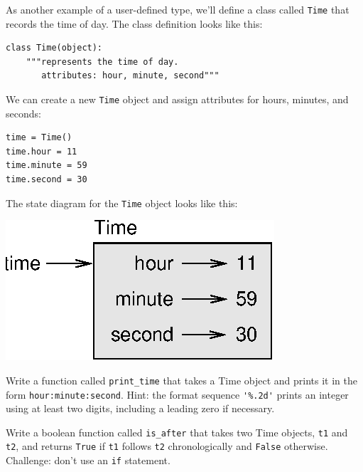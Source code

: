 \documentclass[10pt]{book}
\begin{document}
As another example of a user-defined type, we'll define a class called
{\tt Time} that records the time of day.  The class definition looks
like this:


\beforeverb
\begin{verbatim}
class Time(object):
    """represents the time of day.
       attributes: hour, minute, second"""
\end{verbatim}
\afterverb
%
We can create a new {\tt Time} object and assign
attributes for hours, minutes, and seconds:

\beforeverb
\begin{verbatim}
time = Time()
time.hour = 11
time.minute = 59
time.second = 30
\end{verbatim}
\afterverb
%
The state diagram for the {\tt Time} object looks like this:


\beforefig
\centerline{\includegraphics{figs/time.eps}}
\afterfig

\begin{ex}
\label{printtime}
Write a function called \verb"print_time" that takes a 
Time object and prints it in the form {\tt hour:minute:second}.
Hint: the format sequence \verb"'%.2d'" prints an integer using
at least two digits, including a leading zero if necessary.
\end{ex}

\begin{ex}
\label{is_after}


Write a boolean function called \verb"is_after" that
takes two Time objects, {\tt t1} and {\tt t2}, and
returns {\tt True} if {\tt t1} follows {\tt t2} chronologically and
{\tt False} otherwise.  Challenge: don't use an {\tt if} statement.
\end{ex}
\end{document}
